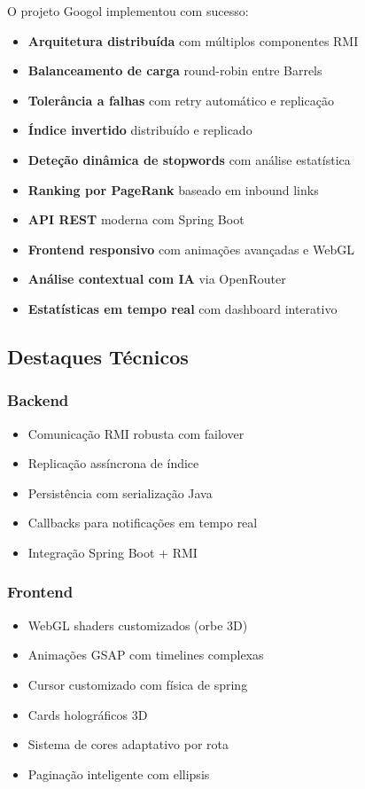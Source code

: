 \documentclass[12pt,a4paper]{article}
\begin{document}
O projeto Googol implementou com sucesso:
\begin{itemize}
    \item \textbf{Arquitetura distribuída} com múltiplos componentes RMI
    \item \textbf{Balanceamento de carga} round-robin entre Barrels
    \item \textbf{Tolerância a falhas} com retry automático e replicação
    \item \textbf{Índice invertido} distribuído e replicado
    \item \textbf{Deteção dinâmica de stopwords} com análise estatística
    \item \textbf{Ranking por PageRank} baseado em inbound links
    \item \textbf{API REST} moderna com Spring Boot
    \item \textbf{Frontend responsivo} com animações avançadas e WebGL
    \item \textbf{Análise contextual com IA} via OpenRouter
    \item \textbf{Estatísticas em tempo real} com dashboard interativo
\end{itemize}

\subsection{Destaques Técnicos}

\subsubsection{Backend}
\begin{itemize}
    \item Comunicação RMI robusta com failover
    \item Replicação assíncrona de índice
    \item Persistência com serialização Java
    \item Callbacks para notificações em tempo real
    \item Integração Spring Boot + RMI
\end{itemize}

\subsubsection{Frontend}
\begin{itemize}
    \item WebGL shaders customizados (orbe 3D)
    \item Animações GSAP com timelines complexas
    \item Cursor customizado com física de spring
    \item Cards holográficos 3D
    \item Sistema de cores adaptativo por rota
    \item Paginação inteligente com ellipsis
\end{itemize}
\end{document}
